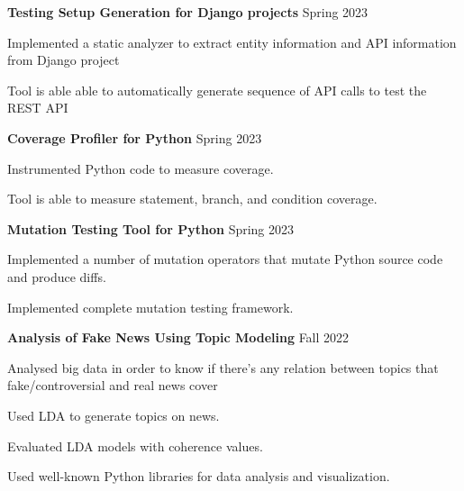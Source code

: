 \begin{cventries}
  \cvproject
    {\textbf{Testing Setup Generation for Django projects}}
    {Spring 2023}
    {
      \begin{cvitems}
        \item {Implemented a static analyzer to extract entity information and API information from Django project}
        \item {Tool is able able to automatically generate sequence of API calls to test the REST API}
      \end{cvitems}
    }
  \cvproject
    {\textbf{Coverage Profiler for Python}}
    {Spring 2023}
    {
      \begin{cvitems}
          \item {Instrumented Python code to measure coverage.}
          \item {Tool is able to measure statement, branch, and condition coverage.}
      \end{cvitems}
    }
  \cvproject
    {\textbf{Mutation Testing Tool for Python}}
    {Spring 2023}
    {
      \begin{cvitems}
          \item {Implemented a number of mutation operators that mutate Python source code and produce diffs.}
          \item {Implemented complete mutation testing framework.}
      \end{cvitems}
    }
  \cvproject
    {\textbf{Analysis of Fake News Using Topic Modeling}}
    {Fall 2022} %
    {
      \begin{cvitems} %
        \item {Analysed big data in order to know if there's any relation between topics that fake/controversial and real news cover}
        \item {Used LDA to generate topics on news.}
        \item {Evaluated LDA models with coherence values.}
        \item {Used well-known Python libraries for data analysis and visualization.}
      \end{cvitems}
    }%
\end{cventries}